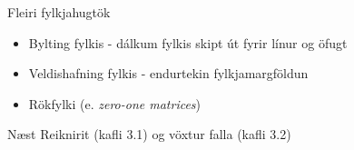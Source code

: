 \documentclass[handout]{beamer}
\begin{document}
\begin{frame}{Fleiri fylkjahugtök}
    \begin{itemize}
        \item Bylting fylkis - dálkum fylkis skipt út fyrir línur og öfugt
        \item Veldishafning fylkis - endurtekin fylkjamargföldun
        \item Rökfylki (e. \emph{zero-one matrices})
    \end{itemize}
\end{frame}

\begin{frame}{Næst}
Reiknirit (kafli 3.1) og vöxtur falla (kafli 3.2)
\end{frame}
\end{document}
